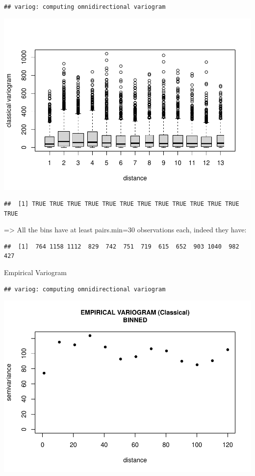 \documentclass[
]{article}
\begin{document}
\begin{verbatim}
## variog: computing omnidirectional variogram
\end{verbatim}

\includegraphics{Assignment_1_files/figure-latex/unnamed-chunk-14-1.pdf}

\begin{verbatim}
##  [1] TRUE TRUE TRUE TRUE TRUE TRUE TRUE TRUE TRUE TRUE TRUE TRUE TRUE
\end{verbatim}

=\textgreater{} All the bins have at least pairs.min=30 observations
each, indeed they have:

\begin{verbatim}
##  [1]  764 1158 1112  829  742  751  719  615  652  903 1040  982  427
\end{verbatim}

Empirical Variogram

\begin{verbatim}
## variog: computing omnidirectional variogram
\end{verbatim}

\includegraphics{Assignment_1_files/figure-latex/unnamed-chunk-18-1.pdf}
\end{document}
